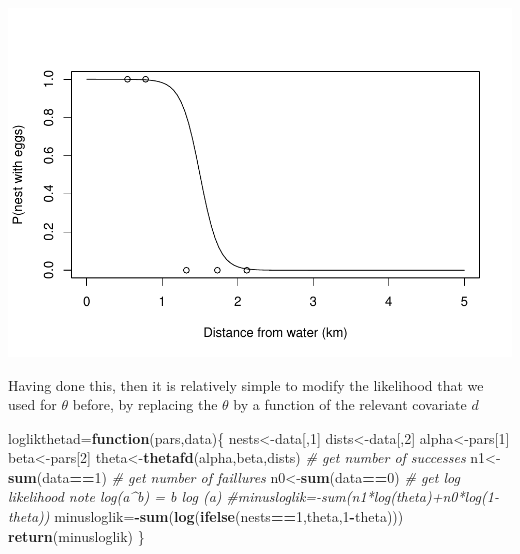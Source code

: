 \documentclass[
]{book}
\newenvironment{Shaded}{\begin{snugshade}}{\end{snugshade}}
\newcommand{\CommentTok}[1]{\textcolor[rgb]{0.56,0.35,0.01}{\textit{#1}}}
\newcommand{\ControlFlowTok}[1]{\textcolor[rgb]{0.13,0.29,0.53}{\textbf{#1}}}
\newcommand{\DecValTok}[1]{\textcolor[rgb]{0.00,0.00,0.81}{#1}}
\newcommand{\FunctionTok}[1]{\textcolor[rgb]{0.13,0.29,0.53}{\textbf{#1}}}
\newcommand{\NormalTok}[1]{#1}
\newcommand{\OtherTok}[1]{\textcolor[rgb]{0.56,0.35,0.01}{#1}}
\newcommand{\SpecialCharTok}[1]{\textcolor[rgb]{0.81,0.36,0.00}{\textbf{#1}}}
\begin{document}
\includegraphics{ECOMODbook_files/figure-latex/ch13.33-1.pdf}

Having done this, then it is relatively simple to modify the likelihood that we used for \(\theta\) before, by replacing the \(\theta\) by a function of the relevant covariate \(d\)

\begin{Shaded}
\begin{Highlighting}[]
\NormalTok{loglikthetad}\OtherTok{=}\ControlFlowTok{function}\NormalTok{(pars,data)\{}
\NormalTok{  nests}\OtherTok{\textless{}{-}}\NormalTok{data[,}\DecValTok{1}\NormalTok{]}
\NormalTok{  dists}\OtherTok{\textless{}{-}}\NormalTok{data[,}\DecValTok{2}\NormalTok{]}
\NormalTok{  alpha}\OtherTok{\textless{}{-}}\NormalTok{pars[}\DecValTok{1}\NormalTok{]}
\NormalTok{  beta}\OtherTok{\textless{}{-}}\NormalTok{pars[}\DecValTok{2}\NormalTok{]}
\NormalTok{  theta}\OtherTok{\textless{}{-}}\FunctionTok{thetafd}\NormalTok{(alpha,beta,dists)}
  \CommentTok{\# get number of successes}
\NormalTok{  n1}\OtherTok{\textless{}{-}}\FunctionTok{sum}\NormalTok{(data}\SpecialCharTok{==}\DecValTok{1}\NormalTok{)}
  \CommentTok{\# get number of faillures}
\NormalTok{  n0}\OtherTok{\textless{}{-}}\FunctionTok{sum}\NormalTok{(data}\SpecialCharTok{==}\DecValTok{0}\NormalTok{)}
  \CommentTok{\# get log likelihood note log(a\^{}b) = b log (a)}
  \CommentTok{\#minusloglik={-}sum(n1*log(theta)+n0*log(1{-}theta))}
\NormalTok{  minusloglik}\OtherTok{=}\SpecialCharTok{{-}}\FunctionTok{sum}\NormalTok{(}\FunctionTok{log}\NormalTok{(}\FunctionTok{ifelse}\NormalTok{(nests}\SpecialCharTok{==}\DecValTok{1}\NormalTok{,theta,}\DecValTok{1}\SpecialCharTok{{-}}\NormalTok{theta)))}
  \FunctionTok{return}\NormalTok{(minusloglik)}
\NormalTok{\}}
\end{Highlighting}
\end{Shaded}
\end{document}
